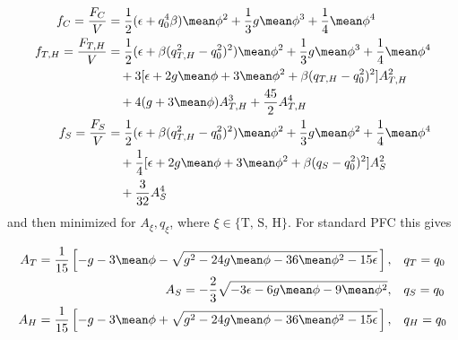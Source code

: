 \begin{subequations}
\begin{align}
f_C = \frac{F_C}{V} &= \frac{1}{2}(\epsilon + q_0^4 \beta) \mean\phi^2 + \frac{1}{3}g \mean\phi^3 + \frac{1}{4}\mean\phi^4 \\
f_{T,H} = \frac{F_{T,H}}{V} &= \frac{1}{2}(\epsilon + \beta (q_{T,H}^2 - q_0^2)^2 ) \mean\phi^2 + \frac{1}{3}g \mean\phi^3 + \frac{1}{4}\mean\phi^4 \\ \nonumber
& \quad + 3 [\epsilon + 2 g \mean\phi + 3 \mean\phi^2 + \beta(q_{T,H} - q_0^2)^2]A_{T,H}^2  \\ \nonumber
& \quad + 4 (g + 3 \mean\phi)A_{T,H}^3 + \frac{45}{2}A_{T,H}^4 \\
f_S = \frac{F_S}{V} &= \frac{1}{2}(\epsilon + \beta (q_{T,H}^2 - q_0^2)^2 ) \mean\phi^2 + \frac{1}{3}g \mean\phi^2 + \frac{1}{4}\mean\phi^4 \\ \nonumber
& \quad + \frac{1}{4} [\epsilon + 2 g \mean\phi + 3 \mean\phi^2 + \beta(q_S - q_0^2)^2]A_S^2  \\ \nonumber
& \quad + \frac{3}{32}A_S^4
\end{align}
\end{subequations}
%
and then minimized for $A_\xi, q_\xi$, where $\xi \in \{\text{T, S, H}\}$.  For standard PFC this gives

\begin{subequations}
\begin{align}
A_T = \frac{1}{15} \left[ -g - 3\mean\phi - \sqrt{g^2 - 24 g \mean\phi - 36 \mean\phi^2 - 15 \epsilon} \, \right], & \quad q_T = q_0 \\
A_S = -\frac{2}{3} \sqrt{-3 \epsilon - 6g\mean\phi - 9 \mean\phi^2}, & \quad q_S = q_0 \\
A_H = \frac{1}{15} \left[ -g - 3\mean\phi + \sqrt{g^2 - 24 g \mean\phi - 36 \mean\phi^2 - 15 \epsilon} \, \right], & \quad q_H = q_0
\end{align}    
\end{subequations}

